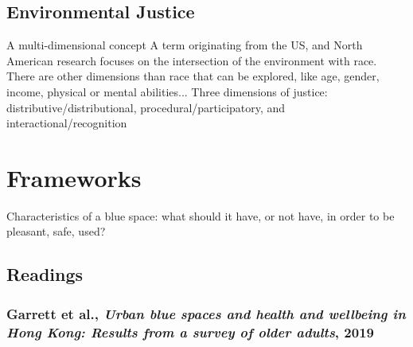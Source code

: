 \documentclass{article}
\begin{document}
\subsection{Environmental Justice}

\begin{outline}
	\1 A multi-dimensional concept
	\1 A term originating from the US, and North American research focuses on the intersection of the environment with race. There are other dimensions than race that can be explored, like age, gender, income, physical or mental abilities...
	\1 Three dimensions of justice: distributive/distributional, procedural/participatory, and interactional/recognition \parencite{kronenberg2020environmental}
\end{outline}

\section{Frameworks}

\begin{outline}
	\1 Characteristics of a blue space: what should it have, or not have, in order to be pleasant, safe, used? \parencite{}
\end{outline}




\subsection{Readings}

\subsubsection{Garrett et al., \textit{Urban blue spaces and health and wellbeing in Hong Kong: Results from a survey of older adults}, 2019} \parencite{garrett2019urban}
\end{document}
